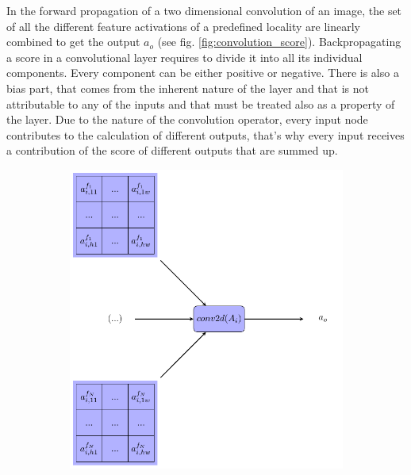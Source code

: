\documentclass[preprint]{elsarticle}
\theoremstyle{definition} %
\theoremstyle{remark}
\begin{document}
In the forward propagation of a two dimensional convolution of an image, the set of all the different feature activations of a predefined locality are linearly combined to get the output $a_o$ (see fig. \ref{fig:convolution_score}). Backpropagating a score in a convolutional layer requires to divide it into all its individual components. Every component can be either positive or negative. There is also a bias part, that comes from the inherent nature of the layer and that is not attributable to any of the inputs and that must be treated also as a property of the layer. Due to the nature of the convolution operator, every input node contributes to the calculation of different outputs, that's why every input receives a contribution of the score of different outputs that are summed up.

\begin{figure}[h!]
	\centering
	\begin{subfigure}{0.4\textwidth}
		\includegraphics[scale=0.4]{figures/score_conv2d.pdf}
	\end{subfigure}
	~ %
	\begin{subfigure}{0.4\textwidth}

\end{subfigure}
\end{figure}
\end{document}
